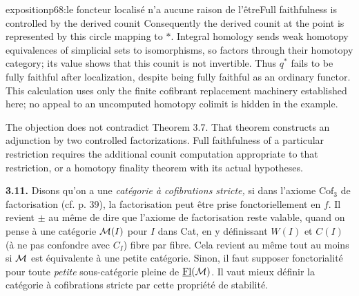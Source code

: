 \begin{dcomment}{exposition}{p68:le foncteur localisé n'a aucune raison de l'être}{Full faithfulness is controlled by the derived counit}
Consequently the derived counit at the point is represented by this circle mapping to $*$. Integral homology sends weak homotopy equivalences of simplicial sets to isomorphisms, so factors through their homotopy category; its value shows that this counit is not invertible. Thus $q^*$ fails to be fully faithful after localization, despite being fully faithful as an ordinary functor. This calculation uses only the finite cofibrant replacement machinery established here; no appeal to an uncomputed homotopy colimit is hidden in the example.

The objection does not contradict Theorem 3.7. That theorem constructs an adjunction by two controlled factorizations. Full faithfulness of a particular restriction requires the additional counit computation appropriate to that restriction, or a homotopy finality theorem with its actual hypotheses.
\end{dcomment}


\textbf{3.11.} Disons qu'on a une \textit{catégorie à cofibrations stricte,} si dans l'axiome $\mathrm{Cof}_3$ de factorisation (cf. p. 39), la factorisation peut être prise fonctoriellement en $f$. Il revient $\pm$ au même de dire que l'axiome de factorisation reste valable, quand on pense à une catégorie $\mathcal{M}(I)$ pour $I$ dans Cat, en y définissant $W(I)$ et $C(I)$ (à ne pas confondre avec $C_I$) fibre par fibre. Cela revient au même tout au moins si $\mathcal{M}$ est équivalente à une petite catégorie. Sinon, il faut supposer fonctorialité pour toute \textit{petite} sous-catégorie pleine de $\underline{\mathrm{Fl}}(\mathcal{M})$. Il vaut mieux définir la catégorie à cofibrations stricte par cette propriété de stabilité.

